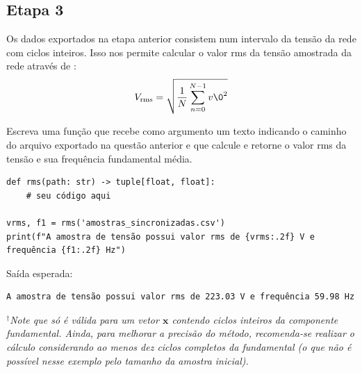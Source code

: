\subsection*{Etapa 3}
Os dados exportados na etapa anterior consistem num intervalo da tensão da rede com ciclos inteiros.
Isso nos permite calcular o valor rms da tensão amostrada da rede através de :
\begin{equation}\label{eq:rms}
V_{\text{rms}} = \sqrt{\dfrac{1}{N} \sum_ {n=0} ^{N-1} v\0 ^2}
\end{equation}

Escreva uma função   que recebe como argumento um texto indicando o caminho
do arquivo exportado na questão anterior e que calcule e retorne o valor rms da tensão e sua frequência fundamental média.
\begin{verbatim}
def rms(path: str) -> tuple[float, float]:
    # seu código aqui

vrms, f1 = rms('amostras_sincronizadas.csv')
print(f"A amostra de tensão possui valor rms de {vrms:.2f} V e frequência {f1:.2f} Hz")
\end{verbatim}

Saída esperada:
\begin{verbatim}
A amostra de tensão possui valor rms de 223.03 V e frequência 59.98 Hz
\end{verbatim}

$^\dagger$\emph{Note que  só é válida para um vetor $\mathbf{x}$ contendo ciclos inteiros da componente fundamental.
Ainda, para melhorar a precisão do método, recomenda-se realizar o cálculo considerando ao menos dez ciclos completos da fundamental
    (o que não é possível nesse exemplo pelo tamanho da amostra inicial).}


